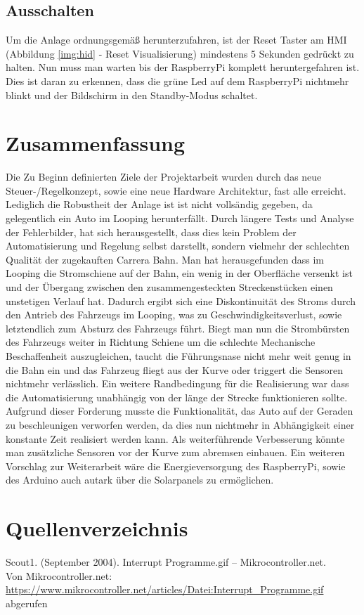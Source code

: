 \documentclass[a4paper, 11pt]{report}
\begin{document}
\section{Ausschalten}
Um die Anlage ordnungsgemäß herunterzufahren, ist der Reset Taster am HMI (Abbildung \ref{img:hid} - Reset Visualisierung) mindestens 5 Sekunden gedrückt zu halten.
Nun muss man warten bis der RaspberryPi komplett heruntergefahren ist. Dies ist daran zu erkennen, dass die grüne Led auf dem RaspberryPi nichtmehr blinkt und der Bildschirm in den Standby-Modus schaltet.
\chapter{Zusammenfassung}
Die Zu Beginn definierten Ziele der Projektarbeit wurden durch das neue Steuer-/Regelkonzept, sowie eine neue Hardware Architektur, fast alle erreicht. Lediglich die Robustheit der Anlage ist ist nicht vollsändig gegeben, da gelegentlich ein Auto im Looping herunterfällt.
Durch längere Tests und Analyse der Fehlerbilder, hat sich herausgestellt, dass dies kein Problem der Automatisierung und Regelung selbst darstellt, sondern vielmehr der schlechten Qualität der zugekauften Carrera Bahn.
Man hat herausgefunden dass im Looping die Stromschiene auf der Bahn, ein wenig in der Oberfläche versenkt ist und der Übergang zwischen den zusammengesteckten Streckenstücken einen unstetigen Verlauf hat. Dadurch ergibt sich eine Diskontinuität des Stroms durch den Antrieb des Fahrzeugs im Looping, was zu Geschwindigkeitsverlust, sowie letztendlich zum Absturz des Fahrzeugs führt. Biegt man nun die Strombürsten des Fahrzeugs weiter in Richtung Schiene um die schlechte Mechanische Beschaffenheit auszugleichen, taucht die Führungsnase nicht mehr weit genug in die Bahn ein und das Fahrzeug fliegt aus der Kurve oder triggert die Sensoren nichtmehr verlässlich.
Ein weitere Randbedingung für die Realisierung war dass die Automatisierung unabhängig von der länge der Strecke funktionieren sollte.
Aufgrund dieser Forderung musste die Funktionalität, das Auto auf der Geraden zu beschleunigen verworfen werden, da dies nun nichtmehr in Abhängigkeit einer konstante Zeit realisiert werden kann. Als weiterführende Verbesserung könnte man zusätzliche Sensoren vor der Kurve zum abremsen einbauen.
Ein weiteren Vorschlag zur Weiterarbeit wäre die Energieversorgung des RaspberryPi, sowie des Arduino auch autark über die Solarpanels zu ermöglichen.




\chapter{Quellenverzeichnis}
Scout1. (September 2004). Interrupt Programme.gif – Mikrocontroller.net. 
\\Von Mikrocontroller.net: \href{https://www.mikrocontroller.net/articles/Datei:Interrupt_Programme.gif}
{\url{https://www.mikrocontroller.net/articles/Datei:Interrupt_Programme.gif}} abgerufen \label{src:scout1}
\end{document}
